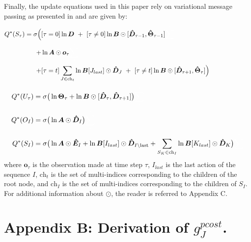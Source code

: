 \documentclass[twoside,11pt]{article}
\begin{document}
Finally, the update equations used in this paper rely on variational message passing as presented in \citep{AI_VMP,VMP_TUTO} and are given by:
\begin{align*}
Q^*(S_\tau) = \sigma\Big(&[\tau = 0] \ln \bm{D} \,\,+\,\, [\tau \neq 0] \ln \bm{B} \odot [ \bm{\hat{D}}_{\tau - 1}, \bm{\hat{\Theta}}_{\tau - 1}] {\color{white}\sum^{t}}\\
+ &\ln \bm{A} \odot \bm{o}_\tau {\color{white}\sum_{\tau}^{t}}\\
+ &[\tau = t] \sum_{J \in \text{ch}_t} \ln \bm{B}[J_{last}] \odot \bm{\hat{D}}_{J} \,\,+\,\, [\tau \neq t] \ln \bm{B} \odot [ \bm{\hat{D}}_{\tau + 1}, \bm{\hat{\Theta}}_{\tau}]\Big)\quad \quad \quad \quad \quad \quad \,\,
\end{align*}
\vspace{-1.5cm}
\begin{align*}
Q^*(U_\tau) &= \sigma \big( \ln \bm{\Theta}_\tau + \ln \bm{B} \odot [ \bm{\hat{D}}_{\tau}, \bm{\hat{D}}_{\tau + 1}] \big) {\color{white}\sum_{\tau}^{t}}\\
Q^*(O_I) &= \sigma \big( \ln \bm{A} \odot \bm{\hat{D}}_I \big){\color{white}\sum_{\tau}^{t}}\\
Q^*(S_I) &= \sigma \big( \ln \bm{A} \odot \bm{\hat{E}}_I + \ln \bm{B}[I_{last}] \odot \bm{\hat{D}}_{I \setminus \text{last}} + \sum_{S_K \in \text{ch}_I} \ln \bm{B}[K_{last}] \odot \bm{\hat{D}}_{K} \big) {\color{white}\sum_{\tau}^{t}}
\end{align*}
where $\bm{o}_\tau$ is the observation made at time step $\tau$, $I_{last}$ is the last action of the sequence $I$, $\text{ch}_t$ is the set of multi-indices corresponding to the children of the root node, and $\text{ch}_I$ is the set of multi-indices corresponding to the children of $S_I$. For additional information about $\odot$, the reader is referred to Appendix C.

\section*{Appendix B: Derivation of $g^{pcost}_J$.}
\end{document}
